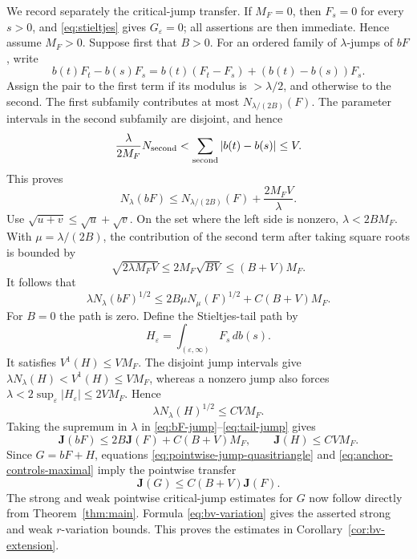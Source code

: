 \documentclass[11pt]{article}
\numberwithin{equation}{section}
\theoremstyle{remark}
\theoremstyle{definition}
\begin{document}
We record separately the critical-jump transfer.  If $M_F=0$, then
$F_s=0$ for every $s>0$, and \eqref{eq:stieltjes} gives $G_\varepsilon=0$;
all assertions are then immediate.  Hence assume $M_F>0$.  Suppose first
that $B>0$.  For an ordered family of $\lambda$-jumps of $bF$, write
\[
 b(t)F_t-b(s)F_s
 =b(t)(F_t-F_s)+(b(t)-b(s))F_s.
\]
Assign the pair to the first term if its modulus is $>\lambda/2$, and
otherwise to the second.  The first subfamily contributes at most
$N_{\lambda/(2B)}(F)$.  The parameter intervals in the second subfamily
are disjoint, and hence
\[
 \frac{\lambda}{2M_F}N_{\rm second}
 <\sum_{\rm second}|b(t)-b(s)|\le V.
\]
This proves
\begin{equation}\label{eq:bF-count}
 N_\lambda(bF)
 \le N_{\lambda/(2B)}(F)+\frac{2M_FV}{\lambda}.
\end{equation}
Use $\sqrt{u+v}\le\sqrt u+\sqrt v$.  On the set where the left side is
nonzero, $\lambda<2BM_F$.  With $\mu=\lambda/(2B)$, the contribution of
the second term after taking square roots is bounded by
\[
 \sqrt{2\lambda M_FV}
 \le2M_F\sqrt{BV}\le(B+V)M_F.
\]
It follows that
\begin{equation}\label{eq:bF-jump}
 \lambda N_\lambda(bF)^{1/2}
 \le2B\mu N_\mu(F)^{1/2}+C(B+V)M_F.
\end{equation}
For $B=0$ the path is zero.  Define the Stieltjes-tail path by
\[
H_\varepsilon=\int_{(\varepsilon,\infty)}F_s\,db(s).
\]
It satisfies $V^1(H)\le VM_F$.  The disjoint jump intervals give
$\lambda N_\lambda(H)<V^1(H)\le VM_F$, whereas a nonzero jump also forces
$\lambda<2\sup_\varepsilon|H_\varepsilon|\le2VM_F$.  Hence
\begin{equation}\label{eq:tail-jump}
 \lambda N_\lambda(H)^{1/2}\le C VM_F.
\end{equation}
Taking the supremum in $\lambda$ in
\eqref{eq:bF-jump}--\eqref{eq:tail-jump} gives
\[
 \mathbf J(bF)\le2B\mathbf J(F)+C(B+V)M_F,
 \qquad
 \mathbf J(H)\le CVM_F.
\]
Since $G=bF+H$, equations
\eqref{eq:pointwise-jump-quasitriangle} and
\eqref{eq:anchor-controls-maximal} imply the pointwise transfer
\begin{equation}\label{eq:bv-pointwise-jump-transfer}
 \mathbf J(G)\le C(B+V)\mathbf J(F).
\end{equation}
The strong and weak pointwise critical-jump estimates for $G$ now follow
directly from Theorem~\ref{thm:main}.  Formula
\eqref{eq:bv-variation} gives the asserted strong and weak $r$-variation
bounds.  This proves the estimates in Corollary~\ref{cor:bv-extension}.
\end{document}
